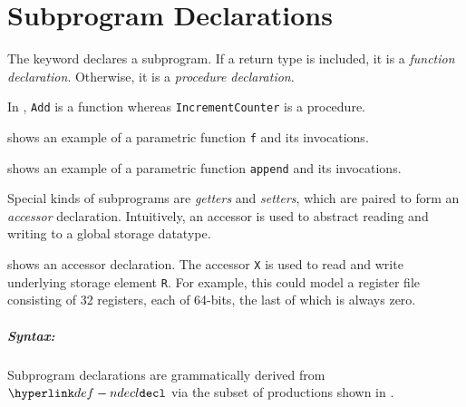\chapter{Subprogram Declarations\label{chap:SubprogramDeclarations}}

The \Tfunc{} keyword declares a subprogram. If a return type is included, it is a \emph{function declaration}.
Otherwise, it is a \emph{procedure declaration}.

In , \verb|Add| is a function whereas \verb|IncrementCounter| is a procedure.

 shows an example of a parametric function \verb|f| and its invocations.

 shows an example of a parametric function \verb|append| and its invocations.

\ChapterOutline

Special kinds of subprograms are \emph{getters} and \emph{setters}, which are paired to form an \emph{accessor}
declaration. Intuitively, an accessor is used to abstract reading and writing to a global storage datatype.

 shows an accessor declaration.
The accessor \texttt{X} is used to read and write underlying storage element \texttt{R}.
For example, this could model a register file consisting of 32 registers, each of 64-bits, the last of which is always zero.


\paragraph{Syntax:} Subprogram declarations are grammatically derived from $\Ndecl$ via the subset of productions shown in
  .

